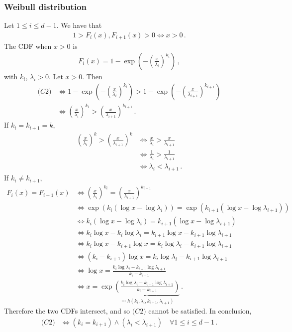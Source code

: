 \documentclass{article}
\begin{document}
\subsubsection{Weibull distribution}
%
Let $1 \leq i \leq d - 1$. We have that
%
\begin{align*}
	1 > F_i(x), F_{i + 1}(x) > 0 \iff x > 0 \,.
\end{align*}
%
The CDF when $x > 0$ is
%
\begin{align*}
	F_i(x) = 1 - \exp\left(-\left(\frac{x}{\lambda_i}\right) ^ {k_i}\right) \,,
\end{align*}
%
with $k_i$, $\lambda_i > 0$. Let $ x> 0$. Then
%
\begin{align*}
	\textit{(C2)} & \iff 1 - \exp\left(-\left(\frac{x}{\lambda_i}\right)
		^ {k_i}\right) > 1- \exp\left(-\left(\frac{x}{\lambda_{i + 1}}\right)
		^ {k_{i + 1}}\right)\\
	&\iff \left(\frac{x}{\lambda_i}\right) ^ {k_i} >
		\left(\frac{x}{\lambda_{i + 1}}\right) ^ {k_{i + 1}} \,.
\end{align*}
%
If $k_i = k_{i + 1} = k$,
%
\begin{align*}
	\left(\frac{x}{\lambda_i}\right) ^ k
		> \left(\frac{x}{\lambda_{i + 1}}\right) ^ k&
		\iff \frac{x}{\lambda_i} > \frac{x}{\lambda_{i + 1}}\\
	&\iff \frac{1}{\lambda_i} > \frac{1}{\lambda_{i + 1}}\\
	&\iff \lambda_i < \lambda_{i + 1} \,.
\end{align*}
%
If $k_i \neq k_{i + 1}$,
%
\begin{align*}
	F_i(x) =F_{i + 1}(x)
		&\iff \left(\frac{x}{\lambda_i}\right) ^ {k_i}
		= \left(\frac{x}{\lambda_{i + 1}}\right) ^ {k_{i + 1}}\\
	&\iff \exp\left(k_i (\log x - \log\lambda_i)\right)
		=\exp\left({k_{i + 1}}(\log x - \log\lambda_{i + 1})\right)\\
	&\iff k_i (\log x - \log\lambda_i)
		= {k_{i + 1}} (\log x - \log\lambda_{i + 1})\\
	&\iff k_i \log x - k_i \log\lambda_i 
		= {k_{i + 1}} \log x - {k_{i + 1}} \log\lambda_{i + 1}\\
	&\iff k_i \log x - {k_{i + 1}} \log x
		=k_i \log\lambda_i - {k_{i + 1}} \log\lambda_{i + 1}\\
	&\iff (k_i - {k_{i + 1}}) \log x 
		= k_i \log\lambda_i - {k_{i + 1}} \log\lambda_{i + 1}\\
	&\iff \log x
		= \frac{k_i \log\lambda_i - {k_{i + 1}}
		\log\lambda_{i + 1}}{k_i - {k_{i + 1}}}\\
	&\iff x
		= \exp\underbrace{\left(\frac{k_i \log\lambda_i - {k_{i + 1}}
		\log\lambda_{i + 1}}{k_i - {k_{i + 1}}}\right)}
		_{\eqqcolon h(k_i, \lambda_i, k_{i + 1}, \lambda_{i + 1})} \,.
\end{align*}
%
Therefore the two CDFs intersect, and so $\textit{(C2)}$ cannot be satisfied.
In conclusion,
%
\begin{align*}
	\textit{(C2)}
		&\iff (k_i = k_{i + 1}) \land (\lambda_i < \lambda_{i + 1})
		\quad \forall 1 \leq i \leq d - 1 \,.
\end{align*}
%
\end{document}
